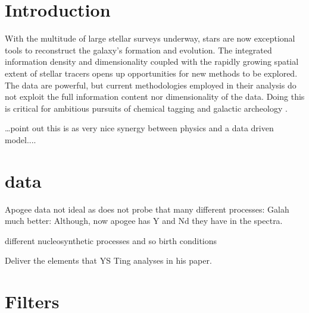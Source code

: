 \documentclass[12pt, preprint]{aastex}
\newcommand{\project}[1]{\textsl{#1}}
\newcommand{\tc}{\project{The~Cannon}}
\begin{document}
\begin{abstract}


\end{abstract}


\section{Introduction}\label{sec:Intro}

With the multitude of large stellar surveys underway, stars are now exceptional tools to reconstruct the galaxy's formation and evolution. 
The integrated information density and dimensionality coupled with the rapidly growing spatial extent of stellar tracers opens up opportunities for new methods to be explored. The data are powerful, but current methodologies employed in their analysis do not exploit the full information content nor dimensionality of the data. Doing this is critical for ambitious pursuits of chemical tagging \citep[e.g.][]{Ting2015} and galactic archeology \citep{Freeman2002, Martell2015}. 

\ldots point out this is as very nice synergy between physics and a data driven model....

\section{data}

Apogee data not ideal as does not probe that many different processes: Galah much better: Although, now apogee has Y and Nd they have in the spectra. 

different nucleosynthetic processes and so birth conditions

Deliver the elements that YS Ting analyses in his paper. 

\section{Filters} 
\end{document}
